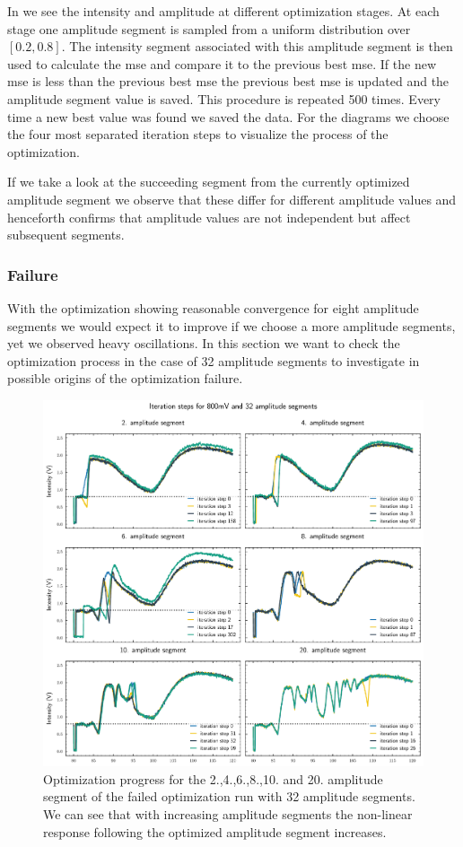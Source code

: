 In  we see the intensity and
amplitude at different optimization stages. At each stage one amplitude
segment is sampled from a uniform distribution over $[0.2,0.8]$. The intensity
segment associated with this amplitude segment is then used to calculate
the \gls{mse} and compare it to the previous best \gls{mse}. If the new
\gls{mse} is less than the previous best \gls{mse} the previous best \gls{mse}
is updated and the amplitude segment value is saved. This procedure is
repeated 500 times. Every time a new best value was found we saved the
data. For the diagrams we choose the four most separated iteration steps to
visualize the process of the optimization.

If we take a look at the succeeding segment from the currently optimized
amplitude segment we observe that these differ for different amplitude
values and henceforth confirms that amplitude values are not independent but
affect subsequent segments.

\subsubsection{Failure}

With the optimization showing reasonable convergence for eight amplitude
segments we would expect it to improve if we choose a more amplitude segments,
yet we observed heavy oscillations. In this section we want to check the
optimization process in the case of 32 amplitude segments to investigate in
possible origins of the optimization failure.

\begin{figure}[htb]
  \centering
  \includegraphics[width=\textwidth]{../figure/intensity/optimization/failure.pdf}
  \caption{Optimization progress for the 2.,4.,6.,8.,10. and 20. amplitude
  segment of the failed optimization run with 32 amplitude segments. We can
  see that with increasing amplitude segments the non-linear response
  following the optimized amplitude segment increases.}
  \label{fig:intensity_optimization_failure}
\end{figure}


